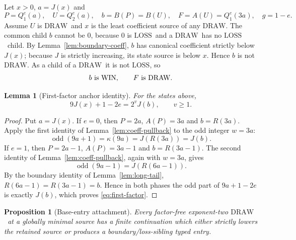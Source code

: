 \documentclass[11pt]{article}
\newtheorem{lemma}[theorem]{Lemma}
\newtheorem{proposition}[theorem]{Proposition}
\newcommand{\WIN}{\ensuremath{\mathrm{WIN}}}
\newcommand{\LOSS}{\ensuremath{\mathrm{LOSS}}}
\newcommand{\DRAW}{\ensuremath{\mathrm{DRAW}}}
\newcommand{\odd}{\operatorname{odd}}
\begin{document}
Let $x>0$, $a=J(x)$ and
\[
  P=Q_1^e(a),\quad U=Q_2^e(a),\quad
  b=B(P)=B(U),\quad F=A(U)=Q_1^e(3a),\quad g=1-e.
\]
Assume $U$ is \DRAW\ and $x$ is the least coefficient source of any \DRAW. The common child $b$ cannot be $0$, because $0$ is \LOSS\ and a \DRAW\ has no \LOSS\ child. By Lemma~\ref{lem:boundary-coeff}, $b$ has canonical coefficient strictly below $J(x)$; because $J$ is strictly increasing, its state source is below $x$. Hence $b$ is not \DRAW.
As a child of a \DRAW\ it is not \LOSS, so
\[
  b\text{ is \WIN},\qquad F\text{ is \DRAW}.
\]
\begin{lemma}[First-factor anchor identity]\label{lem:first-factor}
For the states above,
\begin{equation}\label{eq:first-factor}
  9J(x)+1-2e=2^vJ(b),\qquad v\ge1.
\end{equation}
\end{lemma}

\begin{proof}
Put $a=J(x)$. If $e=0$, then $P=2a$, $A(P)=3a$ and $b=R(3a)$.
Apply the first identity of Lemma~\ref{lem:coeff-pullback} to the odd integer
$w=3a$:
\[
 \odd(9a+1)=\kappa(9a)=J(R(3a))=J(b).
\]
If $e=1$, then $P=2a-1$, $A(P)=3a-1$ and $b=R(3a-1)$. The second identity
of Lemma~\ref{lem:coeff-pullback}, again with $w=3a$, gives
\[
 \odd(9a-1)=J(R(6a-1)).
\]
By the boundary identity of Lemma~\ref{lem:long-tail},
$R(6a-1)=R(3a-1)=b$. Hence in both phases the odd part of
$9a+1-2e$ is exactly $J(b)$, which proves \eqref{eq:first-factor}.
\end{proof}

\begin{proposition}[Base-entry attachment]\label{prop:base-entry}
Every factor-free exponent-two \DRAW\ at a globally minimal source has a
finite continuation which either strictly lowers the retained source or
produces a boundary/loss-sibling typed entry.
\end{proposition}
\end{document}
